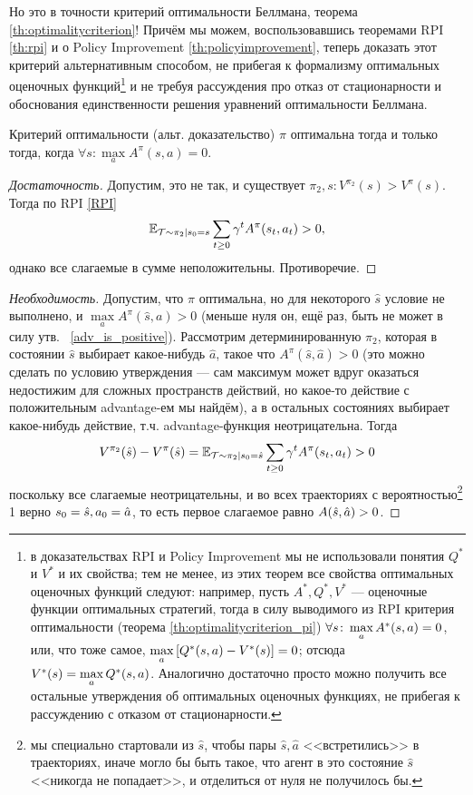 Но это в точности критерий оптимальности Беллмана, теорема \ref{th:optimalitycriterion}! Причём мы можем, воспользовавшись теоремами RPI \ref{th:rpi} и о Policy Improvement \ref{th:policyimprovement}, теперь доказать этот критерий альтернативным способом, не прибегая к формализму оптимальных оценочных функций\footnote{в доказательствах RPI и Policy Improvement мы не использовали понятия $Q^*$ и $V^*$ и их свойства; тем не менее, из этих теорем все свойства оптимальных оценочных функций следуют: например, пусть $A^*, Q^*, V^*$ --- оценочные функции оптимальных стратегий, тогда в силу выводимого из RPI критерия оптимальности (теорема \ref{th:optimalitycriterion_pi}) $\forall s \colon \max\limits_a A^*(s, a) \HM= 0$, или, что тоже самое, $\max\limits_a \left[ Q^*(s, a) \HM- V^*(s) \right] \HM= 0$; отсюда $V^*(s) \HM= \max\limits_a Q^*(s, a)$. Аналогично достаточно просто можно получить все остальные утверждения об оптимальных оценочных функциях, не прибегая к рассуждению с отказом от стационарности.} и не требуя рассуждения про отказ от стационарности и обоснования единственности решения уравнений оптимальности Беллмана.

\begin{theoremBox}[label=th:optimalitycriterion_pi]{Критерий оптимальности (альт. доказательство)}
$\pi$ оптимальна тогда и только тогда, когда $\forall s \colon \max\limits_a A^\pi(s, a) = 0$.
\begin{proof}[Достаточность]
Допустим, это не так, и существует $\pi_2, s \colon V^{\pi_2}(s) > V^{\pi}(s)$. Тогда по RPI \eqref{RPI}
$$\mathbb{E}_{\mathcal{T} \sim \pi_2 \mid s_0 = s} \sum_{t \ge 0} \gamma^t A^{\pi}(s_t, a_t) > 0,$$
однако все слагаемые в сумме неположительны. Противоречие.
\end{proof}
\begin{proof}[Необходимость]
Допустим, что $\pi$ оптимальна, но для некоторого $\hat{s}$ условие не выполнено, и $\max\limits_{a} A^\pi(\hat{s}, a) > 0$ (меньше нуля он, ещё раз, быть не может в силу утв.~ \ref{adv_is_positive}). Рассмотрим детерминированную $\pi_2$, которая в состоянии $\hat{s}$ выбирает какое-нибудь $\hat{a}$, такое что $A^\pi(\hat{s}, \hat{a}) > 0$ (это можно сделать по условию утверждения --- сам максимум может вдруг оказаться недостижим для сложных пространств действий, но какое-то действие с положительным advantage-ем мы найдём), а в остальных состояниях выбирает какое-нибудь действие, т.ч. advantage-функция неотрицательна. Тогда  
$$V^{\pi_2}(\hat{s}) - V^{\pi}(\hat{s}) = \mathbb{E}_{\mathcal{T} \sim \pi_2 | s_0 = \hat{s}} \sum_{t \ge 0} \gamma^t A^{\pi}(s_t, a_t) > 0$$
поскольку все слагаемые неотрицательны, и во всех траекториях с вероятностью\footnote{мы специально стартовали из $\hat{s}$, чтобы пары $\hat{s}, \hat{a}$ <<встретились>> в траекториях, иначе могло бы быть такое, что агент в это состояние $\hat{s}$ <<никогда не попадает>>, и отделиться от нуля не получилось бы.} 1 верно $s_0 \HM= \hat{s}, a_0 \HM= \hat{a}$, то есть первое слагаемое равно $A(\hat{s}, \hat{a}) \HM> 0$. 
\end{proof} 
\end{theoremBox}

